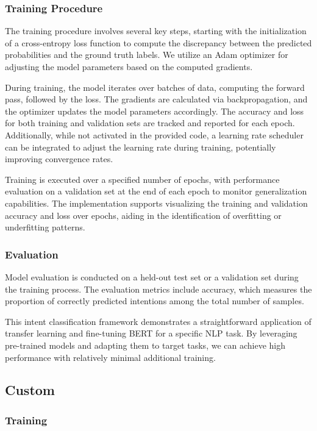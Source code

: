 \subsubsection*{Training Procedure}
The training procedure involves several key steps, starting with the initialization of a cross-entropy loss function to compute the discrepancy between the predicted probabilities and the ground truth labels. We utilize an Adam optimizer for adjusting the model parameters based on the computed gradients.

During training, the model iterates over batches of data, computing the forward pass, followed by the loss. The gradients are calculated via backpropagation, and the optimizer updates the model parameters accordingly. The accuracy and loss for both training and validation sets are tracked and reported for each epoch. Additionally, while not activated in the provided code, a learning rate scheduler can be integrated to adjust the learning rate during training, potentially improving convergence rates.

Training is executed over a specified number of epochs, with performance evaluation on a validation set at the end of each epoch to monitor generalization capabilities. The implementation supports visualizing the training and validation accuracy and loss over epochs, aiding in the identification of overfitting or underfitting patterns.

\subsubsection*{Evaluation}
Model evaluation is conducted on a held-out test set or a validation set during the training process. The evaluation metrics include accuracy, which measures the proportion of correctly predicted intentions among the total number of samples.

This intent classification framework demonstrates a straightforward application of transfer learning and fine-tuning BERT for a specific NLP task. By leveraging pre-trained models and adapting them to target tasks, we can achieve high performance with relatively minimal additional training.


\subsection*{Custom}

\subsubsection*{Training}

